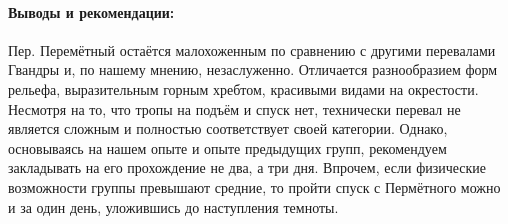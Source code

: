 \paragraph{Выводы и рекомендации:} Пер. Перемётный остаётся малохоженным по сравнению с другими перевалами Гвандры и, по нашему мнению, незаслуженно. Отличается разнообразием форм рельефа, выразительным горным хребтом, красивыми видами на окрестости. Несмотря на то, что тропы на подъём и спуск нет, технически перевал не является сложным и полностью соответствует своей категории. Однако, основываясь на нашем опыте и опыте предыдущих групп, рекомендуем закладывать на его прохождение не два, а три дня. Впрочем, если физические возможности группы превышают средние, то пройти спуск с Пермётного можно и за один день, уложившись до наступления темноты.

\clearpage